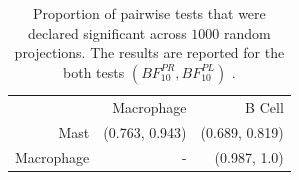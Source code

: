 \documentclass[times,sort&compress,3p]{elsarticle}
\theoremstyle{plain}%
\theoremstyle{definition}
\begin{document}
\begin{table}[ht]
\centering
\caption{Proportion of pairwise tests that were declared significant across $1000$ random projections. The results are reported for the both tests $(BF^{PR}_{10}, BF^{PL}_{10})$ .}
\label{tab:table7a}
\begin{tabular}{|rrr|}
  \hline
   & Macrophage & B Cell \\
    Mast & (0.763, 0.943)  & (0.689, 0.819) \\
    Macrophage & - & (0.987, 1.0)  \\
  \hline
\end{tabular}
\end{table}



\end{document}
